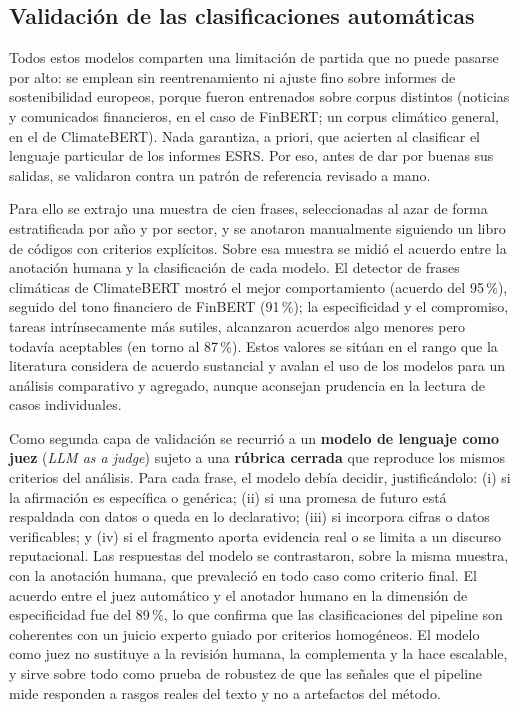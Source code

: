 \subsection{Validación de las clasificaciones automáticas}
\label{sec:validacion-modelos}

Todos estos modelos comparten una limitación de partida que no puede pasarse por alto: se
emplean sin reentrenamiento ni ajuste fino sobre informes de sostenibilidad
europeos, porque fueron entrenados sobre corpus distintos (noticias y comunicados financieros,
en el caso de FinBERT; un corpus climático general, en el de ClimateBERT). Nada garantiza, a
priori, que acierten al clasificar el lenguaje particular de los informes ESRS. Por eso, antes
de dar por buenas sus salidas, se validaron contra un patrón de referencia revisado a mano.

Para ello se extrajo una muestra de cien frases, seleccionadas al azar
de forma estratificada por año y por sector, y se anotaron manualmente siguiendo un libro de
códigos con criterios explícitos. Sobre esa muestra se midió el acuerdo entre la anotación
humana y la clasificación de cada modelo. El detector de frases
climáticas de ClimateBERT mostró el mejor comportamiento (acuerdo del 95\,\%), seguido del tono financiero de FinBERT (91\,\%); la
especificidad y el compromiso, tareas intrínsecamente más sutiles, alcanzaron acuerdos algo
menores pero todavía aceptables (en torno al 87\,\%). Estos valores se
sitúan en el rango que la literatura considera de acuerdo sustancial y avalan el uso de los
modelos para un análisis comparativo y agregado, aunque aconsejan prudencia en la lectura de
casos individuales.

Como segunda capa de validación se recurrió a un \textbf{modelo de lenguaje como juez}
(\textit{LLM as a judge}) sujeto a una \textbf{rúbrica cerrada} que reproduce los mismos
criterios del análisis. Para cada frase, el modelo debía decidir, justificándolo: (i) si la
afirmación es específica o genérica; (ii) si una promesa de futuro está respaldada con datos o
queda en lo declarativo; (iii) si incorpora cifras o datos verificables; y (iv) si el fragmento
aporta evidencia real o se limita a un discurso reputacional. Las respuestas del modelo se
contrastaron, sobre la misma muestra, con la anotación humana, que prevaleció en todo
caso como criterio final. El acuerdo entre el juez automático y el anotador humano en la
dimensión de especificidad fue del 89\,\%, lo que confirma que las clasificaciones del pipeline
son coherentes con un juicio experto guiado por criterios homogéneos. El modelo como juez no
sustituye a la revisión humana, la complementa y la hace escalable, y sirve sobre
todo como prueba de robustez de que las señales que el pipeline mide responden a rasgos reales
del texto y no a artefactos del método.

